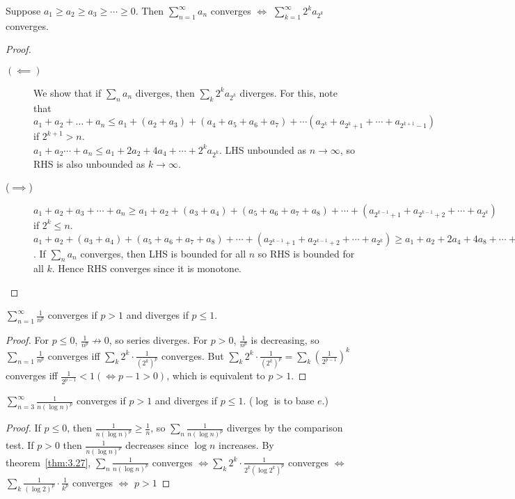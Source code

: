 \begin{thm}[27]
	Suppose $a_1\ge a_2\ge a_3\ge \cdots \ge 0$. Then $\sum_{n=1}^{\infty}{a_{n}}$ converges $\Leftrightarrow $ $\sum_{k=1}^{\infty}{2^{k}a_{2^{k}}}$ converges.
	\begin{proof}
		\begin{description}
			\item[$(\impliedby )$] We show that if $\sum_{n}{a_{n}}$ diverges, then $\sum_{k}{2^{k}a_{2^{k}}}$ diverges.
			      For this, note that $a_1+a_2+\ldots +a_{n}\le a_1+(a_2+a_3)+(a_4+a_5+a_6+a_7)+\cdots (a_{2^{k}}+a_{2^{k}+1}+\cdots + a_{2^{k+1}-1})$ if $2^{k+1}>n$.\\
			      $a_1+a_2 \cdots + a_{n} \le a_1+ 2 a_2 + 4 a_4 + \cdots + 2^{k}a_{2^{k}}$.
			      LHS unbounded as $n\to \infty $, so RHS is also unbounded as $k \to \infty $.

			\item[($\implies$)]
			      $a_1+a_2+a_3+\cdots+a_{n}\ge a_1+a_2+(a_3+a_4)+(a_5+a_6+a_7+a_8)+\cdots +(a_{2^{k-1}+1}+a_{2^{k-1}+2}+ \cdots + a_{2^{k}})$ if $2^{k}\le n$.
			      $a_1+a_2+(a_3+a_4)+(a_5+a_6+a_7+a_8)+\cdots +(a_{2^{k-1}+1}+a_{2^{k-1}+2}+ \cdots + a_{2^{k}})\ge a_1+a_2 + 2a_4 + 4a_8 +\cdots + 2^{k-1}a_{2^{k}}\ge
				      \frac{1}{2}(a_1+2a_2+4a_4+ \cdots +2^{k}a_{2^{k}})
			      $.
			      If $\sum_{n}{a_{n}}$ converges, then LHS is bounded for all $n$ so RHS is bounded for all $k$. Hence RHS converges since it is monotone.
		\end{description}
	\end{proof}
\end{thm}

\begin{thm}[28][$p$-series]
	$\sum_{n=1}^{\infty }{\frac{1}{n^{p}}}$ converges if $p>1$ and diverges if $p\le 1$.
	\begin{proof}
		For $p\le 0$, $\frac{1}{n^{p}} \not \to 0$, so series diverges.
		For $p>0$, $\frac{1}{n^{p}}$ is decreasing, so $\sum_{n=1}{\frac{1}{n^{p}}}$ converges iff $\sum_{k}{2^{k} \cdot \frac{1}{(2^{k})^{p}}}$ converges.
		But $\sum_{k}{2^{k}\cdot \frac{1}{(2^{k})^{p}}}=\sum_{k}{(\frac{1}{2^{p-1}})^{k}}$ converges iff $\frac{1}{2^{p-1}}<1(\Leftrightarrow p-1>0)$, which is equivalent to $p>1$.
	\end{proof}
\end{thm}
\begin{thm}[29]
	$\sum_{n=3}^{\infty }{\frac{1}{n(\log{n})^{p}}}$ converges if $p>1$ and diverges if $p\le 1$. ($\log$ is to base $e$.)
	\begin{proof}
		If $p\le 0$, then $\frac{1}{n (\log{n})^{p}}\ge \frac{1}{n}$, so $\sum_{n}{\frac{1}{n(\log{n})^{p}}}$ diverges by the comparison test.
		If $p>0$ then $\frac{1}{n(\log{n})^{p}}$ decreases since $\log{n}$ increases. By theorem~\ref{thm:3.27}, $\sum_{n}{\frac{1}{n(\log{n})^{p}}}$ converges $\Leftrightarrow \sum_{k}{2^{k} \cdot \frac{1}{2^{k}(\log{2^{k}})^{p}}}$ converges  $\Leftrightarrow $  $\sum_{k}{\frac{1}{(\log{2})^{p}} \cdot \frac{1}{k^p}}$ converges $\Leftrightarrow $ $p>1$
	\end{proof}
\end{thm}

